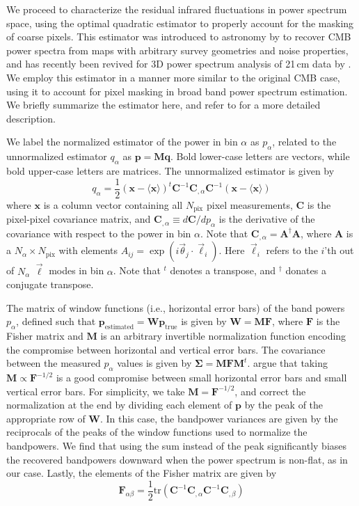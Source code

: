 \documentclass[numberedappendix]{emulateapj}
\newcommand{\Fb}{\mathbf{F}}
\newcommand{\Mb}{\mathbf{M}}
\newcommand{\Cb}{\mathbf{C}}
\newcommand{\Ab}{\mathbf{A}}
\newcommand{\xb}{\mathbf{x}}
\newcommand{\pb}{\mathbf{p}}
\newcommand{\Wb}{\mathbf{W}}
\begin{document}
We proceed to characterize the residual infrared fluctuations in power spectrum space, using the optimal quadratic estimator to properly account for the masking of coarse pixels. This estimator was introduced to astronomy by \citet{Maxpowerspeclossless} to recover CMB power spectra from maps with arbitrary survey geometries and noise properties, and has recently been revived for 3D power spectrum analysis of 21\,cm data by \citet{X13, dillonneben, LT11, DillonFast, ali15}. We employ this estimator in a manner more similar to the original CMB case, using it to account for pixel masking in broad band power spectrum estimation. We briefly summarize the estimator here, and refer to \citet{X13} for a more detailed description.

We label the normalized estimator of the power in bin $\alpha$ as $p_\alpha$, related to the unnormalized estimator $q_\alpha$ as $\mathbf{p} = \Mb \mathbf{q}$. Bold lower-case letters are vectors, while bold upper-case letters are matrices. The unnormalized estimator is given by
\begin{equation}
q_\alpha = \frac{1}{2}(\xb-\langle\xb\rangle)^t \Cb^{-1} \Cb_{,\alpha}\Cb^{-1}(\xb-\langle\xb\rangle)
\end{equation}
where $\xb$ is a column vector containing all $N_\text{pix}$ pixel measurements, $\Cb$ is the pixel-pixel covariance matrix, and $\Cb_{,\alpha}\equiv d\Cb/dp_\alpha$ is the derivative of the covariance with respect to the power in bin $\alpha$. Note that $\Cb_{,\alpha} = \Ab^\dagger\Ab$, where $\Ab$ is a $N_\alpha\times N_\text{pix}$ with elements $A_{ij}=\exp(i\vec{\theta}_j\cdot\vec{\ell}_i)$. Here $\vec{\ell}_i$ refers to the $i$'th out of $N_\alpha$ $\vec{\ell}$ modes in bin $\alpha$. Note that $^t$ denotes a transpose, and $^\dagger$ donates a conjugate transpose.

The matrix of window functions (i.e., horizontal error bars) of the band powers $p_\alpha$, defined such that $\pb_\text{estimated}=\Wb\pb_\text{true}$ is given by $\Wb=\Mb\Fb$, where $\Fb$ is the Fisher matrix and $\Mb$ is an arbitrary invertible normalization function encoding the compromise between horizontal and vertical error bars. The covariance between the measured $p_\alpha$ values is given by $\mathbf{\Sigma} = \Mb\Fb\Mb^t$. \citet{X13} argue that taking $\Mb\propto \Fb^{-1/2}$ is a good compromise between small horizontal error bars and small vertical error bars. For simplicity, we take $\Mb=\Fb^{-1/2}$, and correct the normalization at the end by dividing each element of $\pb$ by the peak of the appropriate row of $\Wb$. In this case, the bandpower variances are given by the reciprocals of the peaks of the window functions used to normalize the bandpowers. We find that using the sum instead of the peak significantly biases the recovered bandpowers downward when the power spectrum is non-flat, as in our case. Lastly, the elements of the Fisher matrix are given by
\begin{equation}
\Fb_{\alpha\beta}=\frac{1}{2}\text{tr}\left(\Cb^{-1} \Cb_{,\alpha} \Cb^{-1} \Cb_{,\beta} \right)	
\end{equation}
\end{document}
